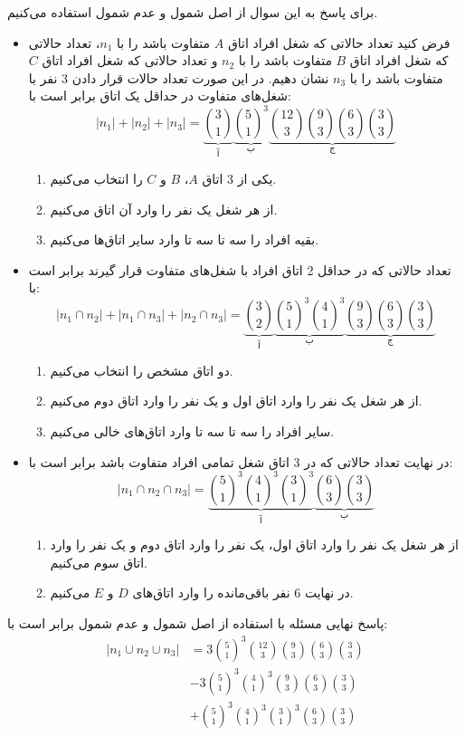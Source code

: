 \p
برای پاسخ به این سوال از اصل شمول و عدم شمول استفاده می‌کنیم.
\begin{itemize}
    \item
    فرض کنید تعداد حالاتی که شغل افراد اتاق 
    $A$
    متفاوت باشد را 
    با 
    $n_1$،
    تعداد حالاتی که شغل افراد اتاق 
    $B$
    متفاوت باشد را 
    با 
    $n_2$
     و تعداد حالاتی که شغل افراد اتاق 
     $C$
     متفاوت باشد را 
     با 
     $n_3$
     نشان دهیم.
     در این صورت تعداد حالات قرار دادن  3 نفر با شغل‌های متفاوت در حداقل یک اتاق برابر است با:
    $$|n_1| + |n_2| + |n_3| = \underbrace{\binom{3}{1}}_{\text{آ}}\underbrace{\binom{5}{1}^3}_{\text{ب}}\underbrace{\binom{12}{3}\binom{9}{3}\binom{6}{3}\binom{3}{3}}_{\text{ج}}$$
    \begin{enumerate}
    \item 
    یکی از 3 اتاق 
    $A$،
     $B$ 
    و $C$
     را انتخاب می‌کنیم.
     \item 
     از هر شغل یک نفر را وارد آن اتاق می‌کنیم.
     \item 
     بقیه افراد را سه تا سه تا وارد سایر اتاق‌ها می‌کنیم.
    \end{enumerate}
    \item
    تعداد حالاتی که در حداقل 2 اتاق افراد با شغل‌های متفاوت قرار گیرند برابر است با:
    $$|n_1 \cap n_2| + |n_1 \cap n_3| + |n_2 \cap n_3| = \underbrace{\binom{3}{2}}_{\text{آ}}\underbrace{\binom{5}{1}^3\binom{4}{1}^3}_{\text{ب}}\underbrace{\binom{9}{3}\binom{6}{3}\binom{3}{3}}_{\text{ج}}$$
    \begin{enumerate}
    \item 
     دو اتاق مشخص را انتخاب می‌کنیم.
     \item 
     از هر شغل یک نفر را وارد اتاق اول و یک نفر را وارد اتاق دوم می‌کنیم.
     \item 
     سایر افراد را سه تا سه تا وارد اتاق‌های خالی می‌کنیم.
    \end{enumerate}
    \item
    در نهایت تعداد حالاتی که در 3 اتاق شغل تمامی افراد متفاوت باشد برابر است با:
    $$|n_1 \cap n_2 \cap n_3| = \underbrace{\binom{5}{1}^3\binom{4}{1}^3\binom{3}{1}^3}_{\text{آ}}\underbrace{\binom{6}{3}\binom{3}{3}}_{\text{ب}}$$
    \begin{enumerate}
    \item
    از هر شغل یک نفر را وارد اتاق اول، یک نفر را وارد اتاق دوم و یک نفر را وارد اتاق سوم می‌کنیم.
    \item
    در نهایت 6 نفر باقی‌مانده را وارد اتاق‌های
    $D$
     و
   $E$ 
    می‌کنیم.
    \end{enumerate}
    \end{itemize}
     پاسخ نهایی مسئله با استفاده از اصل شمول و عدم شمول برابر است با:
     \begin{align*}
    |n_1 \cup n_2 \cup n_3| &= 3\binom{5}{1}^3\binom{12}{3}\binom{9}{3}\binom{6}{3}\binom{3}{3}\\
    &-3\binom{5}{1}^3\binom{4}{1}^3\binom{9}{3}\binom{6}{3}\binom{3}{3}\\
    &+\binom{5}{1}^3\binom{4}{1}^3\binom{3}{1}^3\binom{6}{3}\binom{3}{3}
    \end{align*}